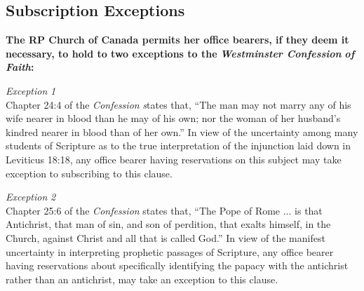 \subsection[Subscription Exceptions]{\textbf{Subscription Exceptions}} 

\textbf{The RP Church of Canada permits her office bearers}\textbf{, if they deem it necessary, to hold to two exceptions to the }\textbf{\textit{Westminster Confession}}\textbf{\textit{ of Faith}}\textbf{:}

\textit{Exception}\textit{ 1 }\\Chapter 24:4 of the \textit{Confession}\textit{ s}tates that, ``The man may not marry any of his wife nearer in blood than he may of his own; nor the woman of her husband's kindred nearer in blood than of her own.'' In view of the uncertainty among many students of Scripture as to the true interpretation of the injunction laid down in Leviticus 18:18, any office bearer having reservations on this subject may take exception to subscribing to this clause.  

\textit{Exception}\textit{ 2}\\Chapter 25:6 of the \textit{Confession} states that, ``The Pope of Rome ... is that Antichrist, that man of sin, and son of perdition, that exalts himself, in the Church, against Christ and all that is called God.'' In view of the manifest uncertainty in interpreting prophetic passages of Scripture, any office bearer having reservations about specifically identifying the papacy with the antichrist rather than an antichrist, may take an exception to this clause.

